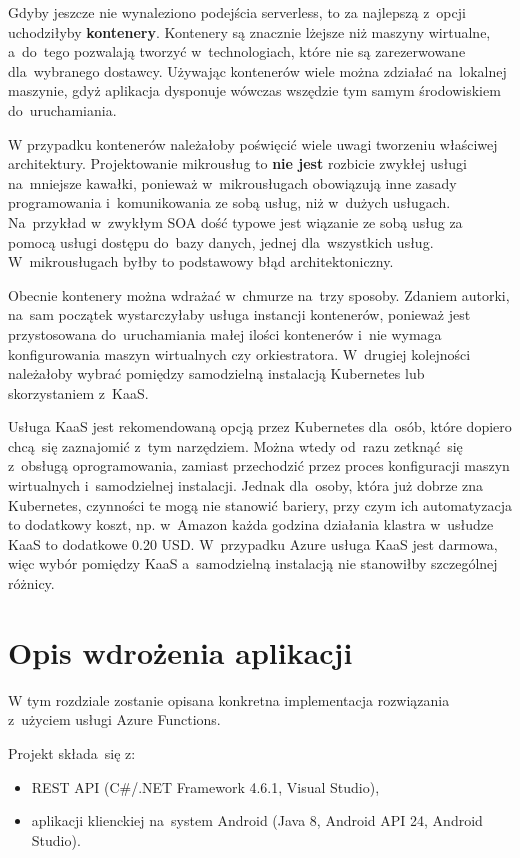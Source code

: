 \documentclass[12pt,a4paper,twoside,titlepage,openright]{book}
\begin{document}
Gdyby jeszcze nie wynaleziono podejścia serverless, to za najlepszą z~opcji uchodziłyby \textbf{kontenery}. Kontenery są znacznie lżejsze niż maszyny wirtualne, a~do~tego pozwalają tworzyć w~technologiach, które nie są zarezerwowane dla~wybranego dostawcy. Używając kontenerów wiele można zdziałać na~lokalnej maszynie, gdyż aplikacja dysponuje wówczas wszędzie tym samym środowiskiem do~uruchamiania. 

W przypadku kontenerów należałoby poświęcić wiele uwagi tworzeniu właściwej architektury. Projektowanie mikrousług to \textbf{nie jest} rozbicie zwykłej usługi na~mniejsze kawałki, ponieważ w~mikrousługach obowiązują inne zasady programowania i~komunikowania ze sobą usług, niż w~dużych usługach. Na~przykład w~zwykłym SOA dość typowe jest wiązanie ze sobą usług za pomocą usługi dostępu do~bazy danych, jednej dla~wszystkich usług. W~mikrousługach byłby to podstawowy błąd architektoniczny. 

Obecnie kontenery można wdrażać w~chmurze na~trzy sposoby. Zdaniem autorki, na~sam początek wystarczyłaby usługa instancji kontenerów, ponieważ jest przystosowana do~uruchamiania małej ilości kontenerów i~nie wymaga konfigurowania maszyn wirtualnych czy orkiestratora. W~drugiej kolejności należałoby wybrać pomiędzy samodzielną instalacją Kubernetes lub skorzystaniem z~KaaS. 

Usługa KaaS jest rekomendowaną opcją przez Kubernetes dla~osób, które dopiero chcą~się zaznajomić z~tym narzędziem. Można wtedy od~razu zetknąć~się z~obsługą oprogramowania, zamiast przechodzić przez proces konfiguracji maszyn wirtualnych i~samodzielnej instalacji. Jednak dla~osoby, która już dobrze zna Kubernetes, czynności te mogą nie stanowić bariery, przy czym ich automatyzacja to dodatkowy koszt, np. w~Amazon każda godzina działania klastra w~usłudze KaaS to dodatkowe 0.20 USD. W~przypadku Azure usługa KaaS jest darmowa, więc wybór pomiędzy KaaS a~samodzielną instalacją nie stanowiłby szczególnej różnicy.



\chapter{Opis wdrożenia aplikacji}

W tym rozdziale zostanie opisana konkretna implementacja rozwiązania z~użyciem usługi Azure Functions.

Projekt składa~się z:
\begin{itemize}
\item REST API (C\#/.NET Framework 4.6.1, Visual Studio),
\item aplikacji klienckiej na~system Android (Java 8, Android API 24, Android Studio).
\end{itemize}
\end{document}
